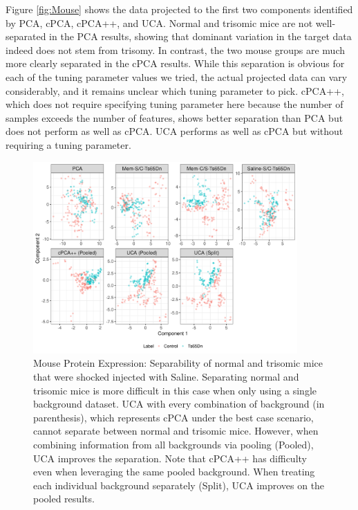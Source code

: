 \documentclass[12pt]{article}
\begin{document}
Figure \ref{fig:Mouse} shows the data projected to the first two components identified by PCA, cPCA, cPCA++, and UCA. Normal and trisomic mice are not well-separated in the PCA results, showing that dominant variation in the target data indeed does not stem from trisomy. In contrast, the two mouse groups are much more clearly separated in the cPCA results. While this separation is obvious for each of the tuning parameter values we tried, the actual projected data can vary considerably, and it remains unclear which tuning parameter to pick.
cPCA++, which does not require specifying tuning parameter here because the number of samples exceeds the number of features, shows better separation than PCA but does not perform as well as cPCA. UCA performs as well as cPCA but without requiring a tuning parameter.

\begin{figure}[th!]
  \centering
  \includegraphics[width = 0.9\textwidth]{figure/Mouse_split_stack_Ts65Dn.png}
  \caption{ Mouse Protein Expression: Separability of normal and trisomic mice that were shocked injected with Saline. Separating normal and trisomic mice is more difficult in this case when only using a single background dataset. UCA with every combination of background (in parenthesis), which represents cPCA under the best case scenario, cannot separate between normal and trisomic mice. However, when combining information from all backgrounds via pooling (Pooled), UCA improves the separation. Note that cPCA++ has difficulty even when leveraging the same pooled background.  When treating each individual background separately (Split), UCA improves on the pooled results.}
  \label{fig:MouseSplitStack}
\end{figure}
\end{document}
